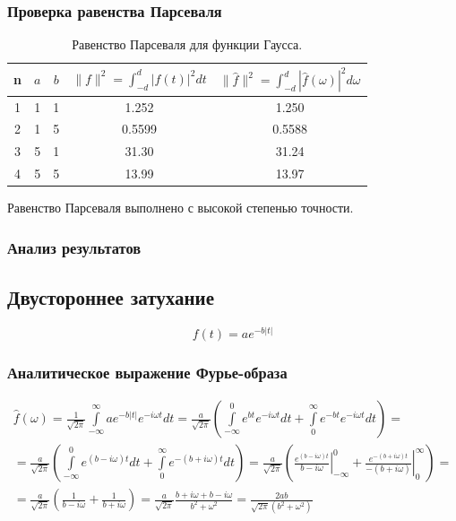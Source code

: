 \documentclass[a5paper, 10pt]{article}
\theoremstyle{definition}
\theoremstyle{plain}
\theoremstyle{remark}
\begin{document}
\subsubsection{Проверка равенства Парсеваля}

\begin{table}[h!]
\caption{Равенство Парсеваля для функции Гаусса.}
\label{tabular:timesandtenses}
\begin{center}
\begin{tabular}{|c|c|c|c|c|}
\hline
n & $a$ & $b$ & $\| f \|^2 = \int_{-d}^d |f(t)|^2 dt $ & $\| \hat{f} \|^2 = \int_{-d}^d |\hat{f}(\omega)|^2 d\omega $ \\
\hline
1 & 1 & 1 &  1.252& 1.250\\
\hline
2 & 1 & 5 & 0.5599 & 0.5588 \\
\hline
3 & 5 & 1 & 31.30  & 31.24 \\
\hline
4 & 5 & 5 & 13.99  & 13.97\\
\hline
\end{tabular}
\end{center}
\end{table}

Равенство Парсеваля выполнено с высокой степенью точности.


\newpage
\subsubsection{Анализ результатов}




\newpage
\subsection{Двустороннее затухание}

\begin{equation}
f(t) = a e^{-b|t|}
\end{equation}


\subsubsection{Аналитическое выражение Фурье-образа}

\begin{multline}
\hat{f}(\omega) =
 \frac{1}{\sqrt{2 \pi}} \int \limits_{-\infty}^{\infty} a e^{-b|t|} e^{-i \omega t} dt =  \frac{a}{\sqrt{2 \pi}}  \left( \int \limits_{-\infty}^{0} e^{b t} e^{-i \omega t} dt  + \int \limits_{0}^{\infty} e^{-b t} e^{-i \omega t} dt  \right) = \\
=  \frac{a}{\sqrt{2 \pi}}  \left( \int \limits_{-\infty}^{0} e^{(b-i \omega) t} dt  + \int \limits_{0}^{\infty}e^{-(b + i \omega) t} dt  \right) 
= \frac{a}{\sqrt{2 \pi}}  \left(  \left. \frac{e^{(b-i \omega) t}}{b-i \omega} \right|_{-\infty}^{0} + \left. \frac{e^{-(b + i \omega) t}}{-(b + i \omega)} \right|_{0}^{\infty}  \right) =\\
=\frac{a}{\sqrt{2 \pi}}  \left( \frac{1}{b-i \omega} + \frac{1}{b + i \omega}  \right) =
\frac{a}{\sqrt{2 \pi}}   \frac{b + i \omega +b - i \omega}{b^2 + \omega^2} = \frac{2ab}{\sqrt{2 \pi} (b^2 + \omega^2)}
\end{multline}
\end{document}
